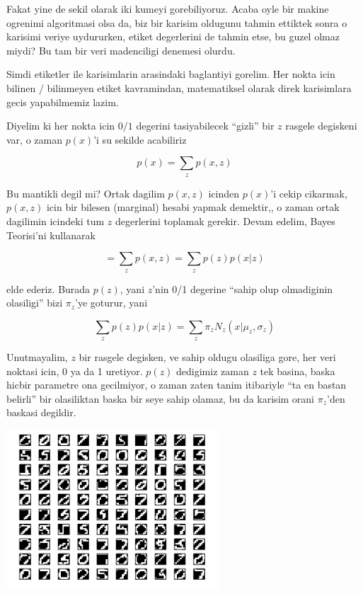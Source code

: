 \documentclass[12pt,fleqn]{article}\usepackage{../common}
\begin{document}
Fakat yine de sekil olarak iki kumeyi gorebiliyoruz. Acaba oyle bir makine
ogrenimi algoritmasi olsa da, biz bir karisim oldugunu tahmin ettiktek
sonra o karisimi veriye uydururken, etiket degerlerini de tahmin etse, bu
guzel olmaz miydi? Bu tam bir veri madenciligi denemesi olurdu. 

Simdi etiketler ile karisimlarin arasindaki baglantiyi gorelim. Her nokta
icin bilinen / bilinmeyen etiket kavramindan, matematiksel olarak direk
karisimlara gecis yapabilmemiz lazim. 

Diyelim ki her nokta icin $0/1$ degerini tasiyabilecek ``gizli'' bir $z$
rasgele degiskeni var, o zaman $p(x)$'i su sekilde acabiliriz

\[ p(x) = \sum_z p(x,z) \]

Bu mantikli degil mi? Ortak dagilim $p(x,z)$ icinden $p(x)$'i cekip
cikarmak, $p(x,z)$ icin bir bilesen (marginal) hesabi yapmak demektir,, o
zaman ortak dagilimin icindeki tum $z$ degerlerini toplamak gerekir. Devam
edelim, Bayes Teorisi'ni kullanarak

\[ = \sum_z p(x,z) = \sum_z  p(z)p(x|z) \]

elde ederiz. Burada $p(z)$, yani $z$'nin 0/1 degerine ``sahip olup
olmadiginin olasiligi'' bizi $\pi_z$'ye goturur, yani

\[ \sum_z  p(z)p(x|z) = \sum_z  \pi_zN_z(x | \mu_z,\sigma_z) \]

Unutmayalim, $z$ bir rasgele degisken, ve sahip oldugu olasiliga gore, her
veri noktasi icin, 0 ya da 1 uretiyor. $p(z)$ dedigimiz zaman $z$ tek
basina, baska hicbir parametre ona gecilmiyor, o zaman zaten tanim
itibariyle ``ta en bastan belirli'' bir olasiliktan baska bir seye sahip
olamaz, bu da karisim orani $\pi_z$'den baskasi degildir. 



















\includegraphics[height=6cm]{digits.png}
\end{document}
